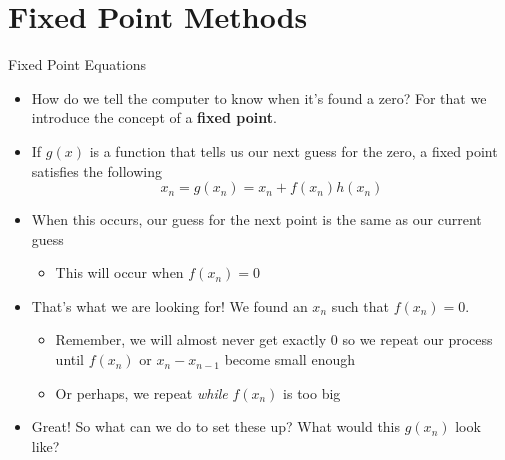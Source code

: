 {}\documentclass[letterpaper,
compress,
xcolor=x11names,
]{beamer}
\begin{document}
\section{Fixed Point Methods}

\begin{frame}{Fixed Point Equations}
	\footnotesize
	\begin{itemize}
		\item How do we tell the computer to know when it's found a zero? For that we introduce the concept of a \textbf{fixed point}. 
		\item If $g(x)$ is a function that tells us our next guess for the zero, a fixed point satisfies the following
		\begin{equation*}
			x_n = g(x_n) = x_n + f(x_n)h(x_n)
		\end{equation*}
		\item When this occurs, our guess for the next point is the same as our current guess
		\begin{itemize}
			\item This will occur when $f(x_n) = 0$
		\end{itemize}
		\item That's what we are looking for! We found an $x_n$ such that $f(x_n)=0$.
		\begin{itemize}
			\item Remember, we will almost never get exactly 0 so we repeat our process until $f(x_n)$ or $x_n - x_{n-1}$ become small enough
			\item Or perhaps, we repeat \textit{while} $f(x_n)$ is too big
		\end{itemize}
		\item Great! So what can we do to set these up? What would this $g(x_n)$ look like?
	\end{itemize}
\end{frame}
\end{document}
